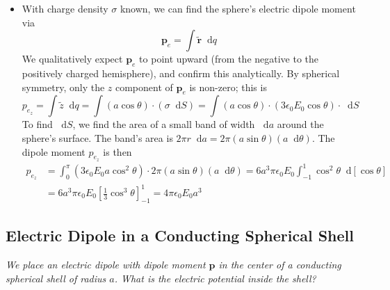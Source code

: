 \documentclass[11pt, a4paper]{article}
\newcommand{\diff}{\mathop{}\!\mathrm{d}} %
\renewcommand{\vec}[1]{\bm{#1}} %
\newcommand{\tvec}[1]{\tilde{\vec{#1}}} %
\newcommand{\ee}{\epsilon_{0}}  %
\newcommand{\pe}{\vec{p}}  %
\begin{document}
\begin{itemize}
	\item With charge density $ \sigma $ known, we can find the sphere's electric dipole moment via
	\begin{equation*}
		\vec{p}_{e} = \int \tvec{r} \diff q
	\end{equation*}
	We qualitatively expect $ \vec{p}_{e} $ to point upward (from the negative to the positively charged hemisphere), and confirm this analytically. By spherical symmetry, only the $ z $ component of $ \vec{p}_{e} $ is non-zero; this is
	\begin{equation*}
		p_{e_{z}} = \int \tilde{z} \diff q = \int (a \cos \theta) \cdot (\sigma \diff S) = \int( a \cos \theta) \cdot (3 \ee E_{0} \cos \theta) \cdot \diff S
	\end{equation*}
	To find $ \diff S $, we find the area of a small band of width $ \diff a $ around the sphere's surface. The band's area is $ 2\pi r \diff a = 2\pi (a \sin \theta ) (a \diff \theta) $. The dipole moment $ p_{e_{z}} $ is then
	\begin{align*}
		p_{e_{z}} &= \int_{0}^{\pi}(3\ee E_{0}a\cos^{2}\theta) \cdot 2\pi (a \sin \theta ) (a \diff \theta) = 6a^{3}\pi \ee E_{0} \int_{-1}^{1}\cos^{2}\theta \diff [\cos \theta]\\
		& = 6a^{3}\pi \ee E_{0} \left[\frac{1}{3}\cos^{3}\theta \right]_{-1}^{1} = 4\pi \ee E_{0} a^{3}
	\end{align*}
\end{itemize}

\subsection{Electric Dipole in a Conducting Spherical Shell}
\textit{We place an electric dipole with dipole moment $ \pe $ in the center of a conducting spherical shell of radius $ a $. What is the electric potential inside the shell?}
\end{document}

